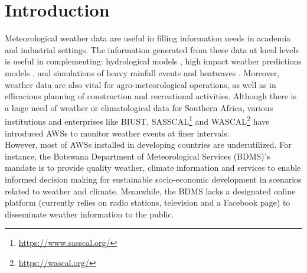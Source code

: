 \documentclass[a4paper, 10pt, conference]{ieeeconf}      %
\begin{document}
\section{\textbf{Introduction}}
\label{Intro}
\noindent
Meteorological weather   data are useful 
in filling information needs in  academia and industrial settings.  The   information generated from these data at local levels is  useful in complementing:  hydrological models \cite{schuol2007using}, high impact weather predictions models \cite{chang2013international}, and simulations of heavy rainfall events \cite{molongwane2020sensitivity,somses2020convection,bopape2021sensitivity} and heatwaves \cite{moses2017heat}. 
Moreover, weather data are also vital for agro-meteorological operations, as well as in efficacious planning of construction and recreational activities. 
Although there is a huge need of weather or climatological  data for Southern Africa, various institutions and   enterprises   like BIUST, SASSCAL\footnote{\url{https://www.sasscal.org/}\label{SASSCALQ}}  and WASCAL\footnote{\url{https://wascal.org/}\label{Wascalnet}}    have  introduced  AWSs to monitor weather events at finer   intervals. \\

However, most of  AWSs installed in developing countries are underutilized.   For instance, the Botswana Department of Meteorological Services (BDMS)'s mandate is to provide quality weather, climate information and services to enable informed decision making for sustainable socio-economic development in scenarios related to weather and climate. %
Meanwhile, the  BDMS lacks a designated online platform (currently relies on    radio stations, television and a Facebook page)    to disseminate  weather information  to the public.
\end{document}
